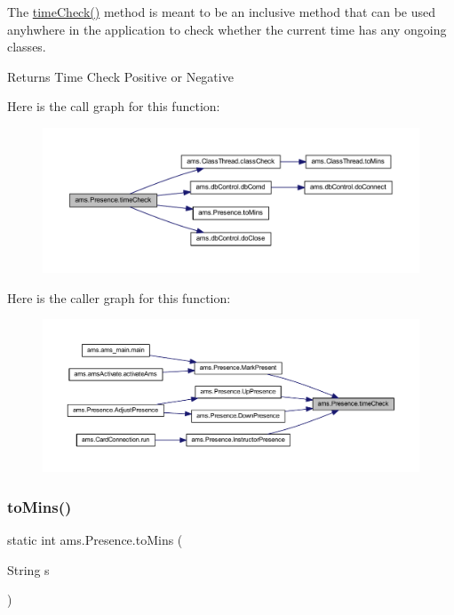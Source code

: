 The \mbox{\hyperlink{classams_1_1_presence_af021bed37055300b60e76853f4bc0666}{time\+Check()}} method is meant to be an inclusive method that can be used anyhwhere in the application to check whether the current time has any ongoing classes.

\begin{DoxyReturn}{Returns}
Time Check Positive or Negative 
\end{DoxyReturn}
Here is the call graph for this function\+:\nopagebreak
\begin{figure}[H]
\begin{center}
\leavevmode
\includegraphics[width=350pt]{classams_1_1_presence_af021bed37055300b60e76853f4bc0666_cgraph}
\end{center}
\end{figure}
Here is the caller graph for this function\+:\nopagebreak
\begin{figure}[H]
\begin{center}
\leavevmode
\includegraphics[width=350pt]{classams_1_1_presence_af021bed37055300b60e76853f4bc0666_icgraph}
\end{center}
\end{figure}
\mbox{\label{classams_1_1_presence_ac7407509b71e22e2ca2fde9d52681b73}} 
\subsubsection{\texorpdfstring{toMins()}{toMins()}}
{\footnotesize\ttfamily static int ams.\+Presence.\+to\+Mins (\begin{DoxyParamCaption}\item[{String}]{s }\end{DoxyParamCaption})\hspace{0.3cm}{\ttfamily [static]}}

